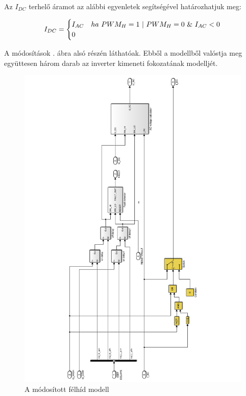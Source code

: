Az $I_{DC}$ terhelő áramot az alábbi egyenletek segítségével határozhatjuk meg:

\begin{equation}
\centering
I_{DC}
=
\begin{cases}
I_{AC}   & ha \  PWM_H = 1 \  | \  PWM_H = 0 \  \& \  I_{AC} < 0 \\
0 & 
\end{cases}   
\end{equation}

A módosítások . ábra alsó részén láthatóak. Ebből a modellből valóstja meg együttesen három darab az inverter kimeneti fokozatának modelljét. 

\begin{figure}[]
	\centering
	\includegraphics[width = 1.1\textwidth]{figures/igbt_model.pdf}
	\caption{A módosított félhíd modell} 
	\label{fig:igbt_model}
\end{figure}




